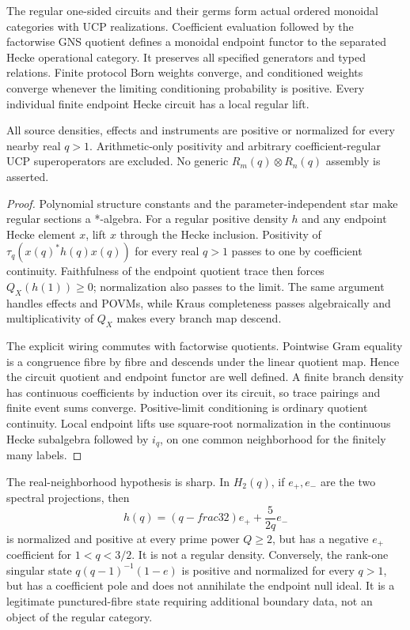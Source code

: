 \begin{theorem}
{\normalfont\statusProved}\quad
The regular one-sided circuits and their germs form actual ordered monoidal
categories with UCP realizations.  Coefficient evaluation followed by the
factorwise GNS quotient defines a monoidal endpoint functor to the separated
Hecke operational category.  It preserves all specified generators and
typed relations.  Finite protocol Born weights converge, and conditioned
weights converge whenever the limiting conditioning probability is positive.
Every individual finite endpoint Hecke circuit has a local regular lift.
\end{theorem}
\begin{scope}
All source densities, effects and instruments are positive or normalized for
every nearby real $q>1$.  Arithmetic-only positivity and arbitrary
coefficient-regular UCP superoperators are excluded.  No generic
$R_m(q)\otimes R_n(q)$ assembly is asserted.
\end{scope}
\begin{proof}
Polynomial structure constants and the parameter-independent star make
regular sections a *-algebra.  For a regular positive density $h$ and any
endpoint Hecke element $x$, lift $x$ through the Hecke inclusion.  Positivity
of $\tau_q(x(q)^*h(q)x(q))$ for every real $q>1$ passes to one by coefficient
continuity.  Faithfulness of the endpoint quotient trace then forces
$Q_X(h(1))\geq0$; normalization also passes to the limit.  The same argument
handles effects and POVMs, while Kraus completeness passes algebraically and
multiplicativity of $Q_X$ makes every branch map descend.

The explicit wiring commutes with factorwise quotients.  Pointwise Gram
equality is a congruence fibre by fibre and descends under the linear quotient
map.  Hence the circuit quotient and endpoint functor are well defined.  A
finite branch density has continuous coefficients by induction over its
circuit, so trace pairings and finite event sums converge.  Positive-limit
conditioning is ordinary quotient continuity.  Local endpoint lifts use
square-root normalization in the continuous Hecke subalgebra followed by
$i_q$, on one common neighborhood for the finitely many labels.
\end{proof}

The real-neighborhood hypothesis is sharp.  In $H_2(q)$, if $e_+,e_-$ are
the two spectral projections, then
\[
 h(q)=(q-	frac32)e_++\frac{5}{2q}e_-
\]
is normalized and positive at every prime power $Q\geq2$, but has a negative
$e_+$ coefficient for $1<q<3/2$.  It is not a regular density.  Conversely,
the rank-one singular state $q(q-1)^{-1}(1-e)$ is positive and normalized for
every $q>1$, but has a coefficient pole and does not annihilate the endpoint
null ideal.  It is a legitimate punctured-fibre state requiring additional
boundary data, not an object of the regular category.
